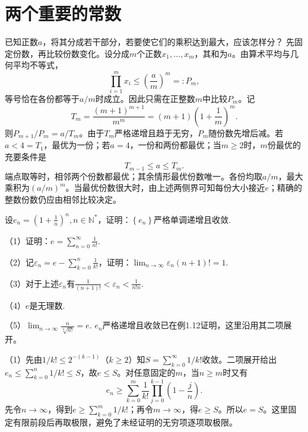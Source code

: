 \par\addvspace{12pt}

\section{两个重要的常数}

\label{sol:sec:analysis:7}

已知正数\(a\)，将其分成若干部分，若要使它们的乘积达到最大，应该怎样分？
\solutionanswer
先固定份数，再比较份数变化。设分成\(m\)个正数\(x_1,\ldots,x_m\)，其和为\(a\)。由算术平均与几何平均不等式，
\[
\prod_{i=1}^m x_i\le\left(\frac am\right)^m=:P_m,
\]
等号恰在各份都等于\(a/m\)时成立。因此只需在正整数\(m\)中比较\(P_m\)。记
\[
T_m=\frac{(m+1)^{m+1}}{m^m}
=(m+1)\left(1+\frac1m\right)^m.
\]
则\(P_{m+1}/P_m=a/T_m\)。由于\(T_m\)严格递增且趋于无穷，\(P_m\)随份数先增后减。若\(a<4=T_1\)，最优为一份；若\(a=4\)，一份和两份都最优；当\(m\ge2\)时，\(m\)份最优的充要条件是
\[
T_{m-1}\le a\le T_m.
\]
端点取等时，相邻两个份数都最优；其余情形最优份数唯一。各份均取\(a/m\)，最大乘积为\((a/m)^m\)。当最优份数很大时，由上述两侧界可知每份大小接近\(e\)；精确的整数份数仍应由相邻比较决定。


设\(e_{n} = {\left( 1 + \frac{1}{n} \right)}^{n} , n \in \mathbb{N}^{*}\)，证明：\(\left\{ e_{n} \right\}\)严格单调递增且收敛.

（1）证明：\(e = \sum _{n = 0}^{\infty} \frac{1}{n !}\).

（2）记\(\varepsilon_{n} = e - \sum _{k = 0}^{n} \frac{1}{k !}\)，证明：\(\lim_{n \to \infty} \varepsilon_{n} \left( n + 1 \right) ! = 1\).

（3）对于上述\(\varepsilon_{n}\)有\(\frac{1}{\left( n + 1 \right) !} < \varepsilon_{n} < \frac{1}{n ! n}\).

（4）\(e\)是无理数.

（5）\(\lim_{n \to \infty} \frac{n}{\sqrt[n]{n !}} = e\).
\solutionanswer
\(e_n\)严格递增且收敛已在例1.12证明，这里沿用其二项展开。

（1）先由\(1/k!\le2^{-(k-1)}\)（\(k\ge2\)）知\(S=\sum_{k=0}^{\infty}1/k!\)收敛。二项展开给出\(e_n\le\sum_{k=0}^n1/k!\le S\)，故\(e\le S\)。对任意固定的\(m\)，当\(n\ge m\)时又有
\[
e_n\ge\sum_{k=0}^m\frac1{k!}\prod_{j=0}^{k-1}\left(1-\frac jn\right).
\]
先令\(n\to\infty\)，得到\(e\ge\sum_{k=0}^m1/k!\)；再令\(m\to\infty\)，得\(e\ge S\)。所以\(e=S\)。这里固定有限前段后再取极限，避免了未经证明的无穷项逐项取极限。


